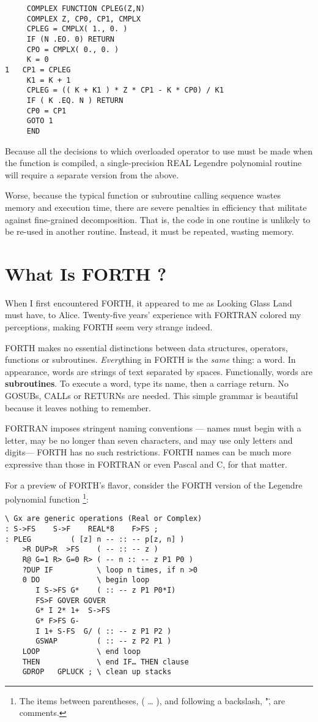 \begin{verbatim} 
     COMPLEX FUNCTION CPLEG(Z,N)
     COMPLEX Z, CP0, CP1, CMPLX
     CPLEG = CMPLX( 1., 0. ) 
     IF (N .EO. 0) RETURN
     CPO = CMPLX( 0., 0. )
     K = 0
1   CP1 = CPLEG
     K1 = K + 1
     CPLEG = (( K + K1 ) * Z * CP1 - K * CP0) / K1
     IF ( K .EQ. N ) RETURN 
     CP0 = CP1
     GOTO 1 
     END
\end{verbatim}

Because all the decisions to which overloaded operator to use must be made when the function is compiled, a single-precision REAL Legendre polynomial routine will require a separate version from the above.

Worse, because the typical function or subroutine calling sequence wastes memory and execution time, there are severe penalties in efficiency that militate against fine-grained decomposition. That is, the code in one routine is unlikely to be re-used in another routine. Instead, it must be repeated, wasting memory. 

\section{What Is FORTH ?}

When I first encountered FORTH, it appeared to me as Looking Glass Land must have, to Alice. Twenty-five years' experience with FORTRAN colored my perceptions, making FORTH seem very strange indeed.

FORTH makes no essential distinctions between data structures, operators, functions or subroutines. \textit{Every}thing in FORTH is the 
\textit{same} thing: a word. In appearance, words are strings of text separated by spaces. Functionally, words are \textbf{subroutines}. To execute a word, type its name, then a carriage return. No GOSUBs, CALLs or RETURNs are needed. This simple grammar is beautiful because it leaves nothing to remember.

FORTRAN imposes stringent naming conventions — names must begin with a letter, may be no longer than seven characters, and may use only letters and digits— FORTH has no such restrictions. FORTH names can be much more expressive than those in FORTRAN or even Pascal and C, for that matter.

For a preview of FORTH's flavor, consider the FORTH version of the Legendre polynomial function \footnote{The items between parentheses, ( … ), and following a backslash, "\", are comments.}:

\begin{verbatim}
\ Gx are generic operations (Real or Complex)
: S->FS    S->F    REAL*8    F>FS ;
: PLEG         ( [z] n -- :: -- p[z, n] )
    >R DUP>R  >FS    ( -- :: -- z )
    R@ G=1 R> G=0 R> ( -- n :: -- z P1 P0 )
    ?DUP IF          \ loop n times, if n >0
    0 DO             \ begin loop
       I S->FS G*    ( :: -- z P1 P0*I)
       FS>F GOVER GOVER
       G* I 2* 1+  S->FS
       G* F>FS G-
       I 1+ S-FS  G/ ( :: -- z P1 P2 )
       GSWAP         ( :: -- z P2 P1 )
    LOOP             \ end loop
    THEN             \ end IF… THEN clause
    GDROP   GPLUCK ; \ clean up stacks
\end{verbatim}

